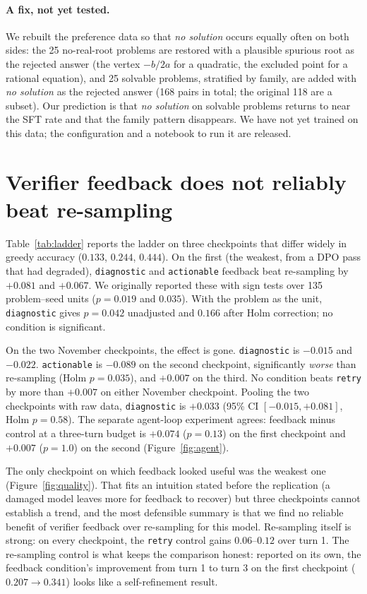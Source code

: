 \documentclass[10pt]{article}
\newcommand{\nosol}{\emph{no solution}}
\begin{document}
\paragraph{A fix, not yet tested.}
We rebuilt the preference data so that \nosol{} occurs equally often on both sides:
the 25 no-real-root problems are restored with a plausible spurious root as the
rejected answer (the vertex $-b/2a$ for a quadratic, the excluded point for a rational
equation), and 25 solvable problems, stratified by family, are added with \nosol{} as
the rejected answer (168 pairs in total; the original 118 are a subset). Our prediction
is that \nosol{} on solvable problems returns to near the SFT rate and that the family
pattern disappears. We have not yet trained on this data; the configuration and a
notebook to run it are released.

\section{Verifier feedback does not reliably beat re-sampling}
\label{sec:feedback}

Table~\ref{tab:ladder} reports the ladder on three checkpoints that differ widely in
greedy accuracy ($0.133$, $0.244$, $0.444$). On the first (the weakest, from a DPO pass
that had degraded), \texttt{diagnostic} and \texttt{actionable} feedback beat
re-sampling by $+0.081$ and $+0.067$. We originally reported these with sign tests
over 135 problem--seed units ($p{=}0.019$ and $0.035$). With the problem as the unit,
\texttt{diagnostic} gives $p{=}0.042$ unadjusted and $0.166$ after Holm correction; no
condition is significant.

On the two November checkpoints, the effect is gone. \texttt{diagnostic} is $-0.015$
and $-0.022$. \texttt{actionable} is $-0.089$ on the second checkpoint, significantly
\emph{worse} than re-sampling (Holm $p{=}0.035$), and $+0.007$ on the third. No
condition beats \texttt{retry} by more than $+0.007$ on either November checkpoint.
Pooling the two checkpoints with raw data, \texttt{diagnostic} is $+0.033$
(95\% CI $[-0.015, +0.081]$, Holm $p{=}0.58$). The separate agent-loop experiment agrees:
feedback minus control at a three-turn budget is $+0.074$ ($p{=}0.13$) on the first
checkpoint and $+0.007$ ($p{=}1.0$) on the second (Figure~\ref{fig:agent}).

The only checkpoint on which feedback looked useful was the weakest one
(Figure~\ref{fig:quality}). That fits an intuition stated before the replication (a
damaged model leaves more for feedback to recover) but three checkpoints cannot
establish a trend, and the most defensible summary is that we find no reliable benefit
of verifier feedback over re-sampling for this model. Re-sampling itself is strong: on
every checkpoint, the \texttt{retry} control gains $0.06$--$0.12$ over turn 1. The
re-sampling control is what keeps the comparison honest: reported on its own, the feedback
condition's improvement from turn 1 to turn 3 on the first checkpoint ($0.207\to0.341$)
looks like a self-refinement result.
\end{document}
